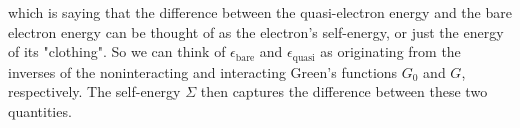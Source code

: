 \documentclass[12pt]{article}
\begin{document}
which is saying that the difference between the quasi-electron energy and the bare electron energy can be thought of as the electron's self-energy, or just the energy of its "clothing". So we can think of $\epsilon_{\text{bare}}$ and $\epsilon_{\text{quasi}}$ as originating from the inverses of the noninteracting and interacting Green's functions $G_0$ and $G$, respectively. The self-energy $\Sigma$ then captures the difference between these two quantities. 
\end{document}
